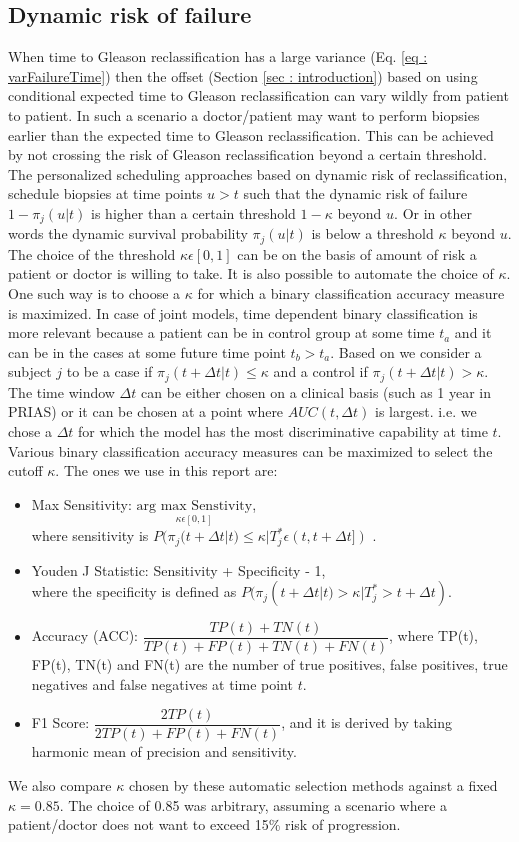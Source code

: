 \subsection{Dynamic risk of failure}
\label{subsec : dynamic_risk_definitions}
When time to Gleason reclassification has a large variance (Eq. \ref{eq : varFailureTime}) then the offset (Section \ref{sec : introduction}) based on using conditional expected time to Gleason reclassification can vary wildly from patient to patient. In such a scenario a doctor/patient may want to perform biopsies earlier than the expected time to Gleason reclassification. This can be achieved by not crossing the risk of Gleason reclassification beyond a certain threshold.\\ 

The personalized scheduling approaches based on dynamic risk of reclassification, schedule biopsies at time points $u > t$ such that the dynamic risk of failure $1 - \pi_j(u|t)$ is higher than a certain threshold $1-\kappa$ beyond $u$. Or in other words the dynamic survival probability $\pi_j(u|t)$ is below a threshold $\kappa$ beyond $u$. The choice of the threshold $\kappa \epsilon [0,1]$ can be on the basis of amount of risk a patient or doctor is willing to take. It is also possible to automate the choice of $\kappa$. One such way is to choose a $\kappa$ for which a binary classification accuracy measure is maximized. In case of joint models, time dependent binary classification is more relevant because a patient can be in control group at some time $t_a$ and it can be in the cases at some future time point $t_b > t_a$. Based on \cite{rizopoulosJMbayes} we consider a subject $j$ to be a case if $\pi_j(t + \Delta t|t) \leq \kappa$ and a control if $\pi_j(t + \Delta t|t) > \kappa$. The time window $\Delta t$ can be either chosen on a clinical basis (such as 1 year in PRIAS) or it can be chosen at a point where $AUC(t, \Delta t)$ \cite{rizopoulosJMbayes} is largest. i.e. we chose a $\Delta t$ for which the model has the most discriminative capability at time $t$. Various binary classification accuracy measures can be maximized to select the cutoff $\kappa$. The ones we use in this report are:

\begin{itemize}
\item Max Sensitivity: $\underset{\kappa \epsilon [0, 1]} {\text{arg max Senstivity}}$,\\
where sensitivity is $P(\pi_j(t + \Delta t|t) \leq \kappa | T^*_j \epsilon (t, t + \Delta t])$ . 
\item Youden J Statistic: Sensitivity + Specificity - 1,\\
where the specificity is defined as $P(\pi_j(t + \Delta t|t) > \kappa | T^*_j > t + \Delta t)$.
\item Accuracy (ACC): $\dfrac{TP(t) + TN(t)}{TP(t) + FP(t) + TN(t) + FN(t)}$, where TP(t), FP(t), TN(t) and FN(t) are the number of true positives, false positives, true negatives and false negatives at time point $t$.
\item F1 Score: $\dfrac{2TP(t)}{2TP(t) + FP(t) + FN(t)}$, and it is derived by taking harmonic mean of precision and sensitivity.
\end{itemize}

We also compare $\kappa$ chosen by these automatic selection methods against a fixed $\kappa = 0.85$. The choice of 0.85 was arbitrary, assuming a scenario where a patient/doctor does not want to exceed 15\% risk of progression.
